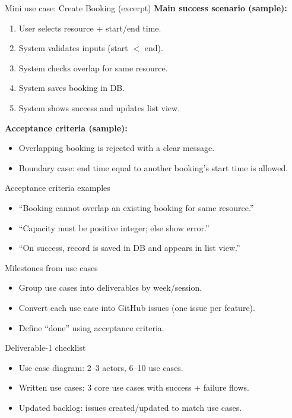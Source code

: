 \documentclass{beamer}
\begin{document}
\begin{frame}{Mini use case: Create Booking (excerpt)}
  \textbf{Main success scenario (sample):}
  \begin{enumerate}[<+->]
    \item User selects resource + start/end time.
    \item System validates inputs (start $<$ end).
    \item System checks overlap for same resource.
    \item System saves booking in DB.
    \item System shows success and updates list view.
  \end{enumerate}
  \vspace{0.2em}
  \textbf{Acceptance criteria (sample):}
  \begin{itemize}
    \item Overlapping booking is rejected with a clear message.
    \item Boundary case: end time equal to another booking's start time is allowed.
  \end{itemize}
  \slidesources{\OOPSUnitVISources}
\end{frame}

\begin{frame}{Acceptance criteria examples}
  \begin{itemize}[<+->]
    \item ``Booking cannot overlap an existing booking for same resource.''
    \item ``Capacity must be positive integer; else show error.''
    \item ``On success, record is saved in DB and appears in list view.''
  \end{itemize}
  \slidesources{\OOPSUnitVISources}
\end{frame}

\begin{frame}{Milestones from use cases}
  \begin{itemize}[<+->]
    \item Group use cases into deliverables by week/session.
    \item Convert each use case into GitHub issues (one issue per feature).
    \item Define ``done'' using acceptance criteria.
  \end{itemize}
  \slidesources{\OOPSUnitVISources}
\end{frame}

\begin{frame}{Deliverable-1 checklist}
  \begin{itemize}[<+->]
    \item Use case diagram: 2--3 actors, 6--10 use cases.
    \item Written use cases: 3 core use cases with success + failure flows.
    \item Updated backlog: issues created/updated to match use cases.
  \end{itemize}
  \slidesources{\OOPSUnitVISources}
\end{frame}
\end{document}
